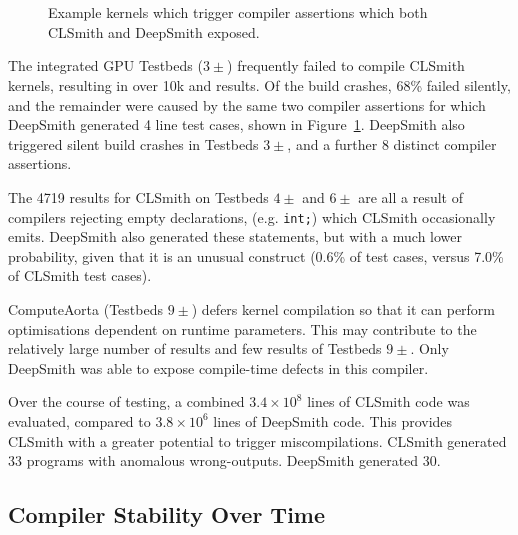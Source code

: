
\begin{figure}
  \centering %
  \\%
  \subfloat[Assertion \emph{iter != pointerOrigMap.end()}.]{%
    \noindent\mbox{\parbox{\columnwidth}{\usebox{\BeigIterAssertion}}}%
    \label{lst:beig-iter-assertion}
  }\\%
  \caption[Kernels which expose errors exposed by CLSmith and DeepSmith]{%
    Example kernels which trigger compiler assertions which both CLSmith and DeepSmith exposed.%
  }%
  \label{lst:common-compiler-assertions}
\end{figure}

The integrated GPU Testbeds ($3\pm$) frequently failed to compile CLSmith kernels, resulting in over 10k \bc and \bto results. Of the build crashes, 68\% failed silently, and the remainder were caused by the same two compiler assertions for which DeepSmith generated 4 line test cases, shown in Figure~\ref{lst:common-compiler-assertions}. DeepSmith also triggered silent build crashes in Testbeds $3\pm$, and a further 8 distinct compiler assertions.

The 4719 \abf results for CLSmith on Testbeds $4\pm$ and $6\pm$ are all a result of compilers rejecting empty declarations, (e.g. \texttt{int;}) which CLSmith occasionally emits. DeepSmith also generated these statements, but with a much lower probability, given that it is an unusual construct (0.6\% of test cases, versus 7.0\% of CLSmith test cases).

ComputeAorta (Testbeds $9\pm$) defers kernel compilation so that it can perform optimisations dependent on runtime parameters. This may contribute to the relatively large number of \arc results and few \bc results of Testbeds $9\pm$. Only DeepSmith was able to expose compile-time defects in this compiler.

Over the course of testing, a combined $3.4 \times 10^8$ lines of CLSmith code was evaluated, compared to $3.8 \times 10^6$ lines of DeepSmith code. This provides CLSmith with a greater potential to trigger miscompilations. CLSmith generated 33 programs with anomalous wrong-outputs. DeepSmith generated 30.


\subsection{Compiler Stability Over Time}%
\label{subsec:clangs}

